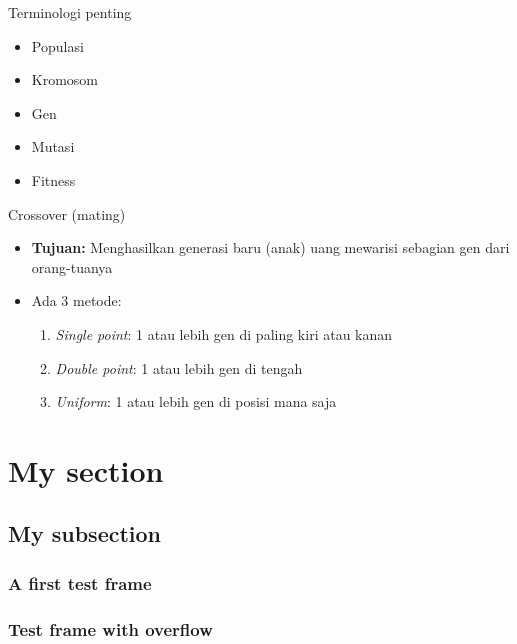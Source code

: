 \documentclass[pdflatex,compress,mathserif]{beamer}
\begin{document}
\begin{frame}{Terminologi penting}
	\begin{itemize}
		\item Populasi
		\item Kromosom
		\item Gen
		\item Mutasi
		\item Fitness
	\end{itemize}
\end{frame}

\begin{frame}{Crossover (mating)}
	\begin{itemize}
		\item \textbf{Tujuan:} Menghasilkan generasi baru (anak) uang mewarisi sebagian gen dari orang-tuanya
		\item Ada 3 metode:
		\begin{enumerate}
			\item \emph{Single point}: 1 atau lebih gen di paling kiri atau kanan
			\item \emph{Double point}: 1 atau lebih gen di tengah
			\item \emph{Uniform}: 1 atau lebih gen di posisi mana saja
		\end{enumerate}
	\end{itemize}
\end{frame}

\section{My section}
\subsection{My subsection}

\begin{frame}
\frametitle{A first test frame}
\lipsum[1]
\end{frame}

\begin{frame}
\frametitle{Test frame with overflow}
\lipsum%
\end{frame}
\end{document}
